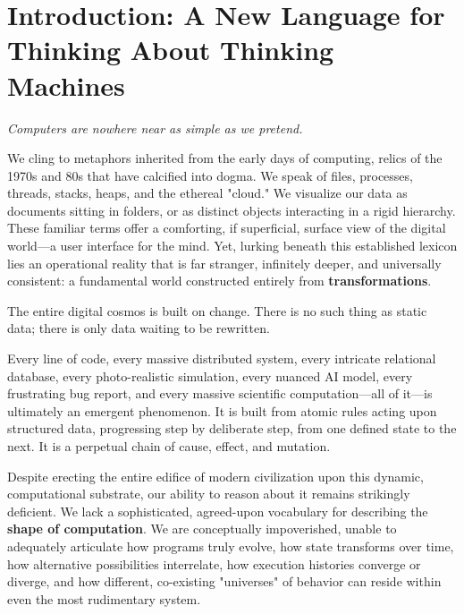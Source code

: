 \chapter*{Introduction: A New Language for Thinking About Thinking Machines}
\label{chap:introduction}

\emph{Computers are nowhere near as simple as we pretend.}

We cling to metaphors inherited from the early days of computing, relics of the 1970s and 80s that have calcified into dogma. We speak of files, processes, threads, stacks, heaps, and the ethereal "cloud." We visualize our data as documents sitting in folders, or as distinct objects interacting in a rigid hierarchy. These familiar terms offer a comforting, if superficial, surface view of the digital world—a user interface for the mind. Yet, lurking beneath this established lexicon lies an operational reality that is far stranger, infinitely deeper, and universally consistent: a fundamental world constructed entirely from \textbf{transformations}.

The entire digital cosmos is built on change. There is no such thing as static data; there is only data waiting to be rewritten.

Every line of code, every massive distributed system, every intricate relational database, every photo-realistic simulation, every nuanced AI model, every frustrating bug report, and every massive scientific computation—all of it—is ultimately an emergent phenomenon. It is built from atomic rules acting upon structured data, progressing step by deliberate step, from one defined state to the next. It is a perpetual chain of cause, effect, and mutation.

Despite erecting the entire edifice of modern civilization upon this dynamic, computational substrate, our ability to reason about it remains strikingly deficient. We lack a sophisticated, agreed-upon vocabulary for describing the \textbf{shape of computation}. We are conceptually impoverished, unable to adequately articulate how programs truly evolve, how state transforms over time, how alternative possibilities interrelate, how execution histories converge or diverge, and how different, co-existing "universes" of behavior can reside within even the most rudimentary system. 

